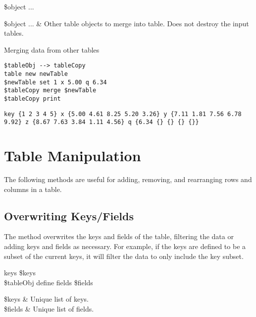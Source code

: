 \documentclass{article}
\begin{document}
\begin{syntax}
 \$object ...
\end{syntax}
\begin{args}
\$object ... & Other table objects to merge into table. Does not destroy the input tables. 
\end{args}

\begin{example}{Merging data from other tables}
\begin{lstlisting}
$tableObj --> tableCopy
table new newTable
$newTable set 1 x 5.00 q 6.34
$tableCopy merge $newTable
$tableCopy print
\end{lstlisting}
\tcblower
\begin{lstlisting}
key {1 2 3 4 5} x {5.00 4.61 8.25 5.20 3.26} y {7.11 1.81 7.56 6.78 9.92} z {8.67 7.63 3.84 1.11 4.56} q {6.34 {} {} {} {}}
\end{lstlisting}
\end{example}
\clearpage
\section{Table Manipulation}
The following methods are useful for adding, removing, and rearranging rows and columns in a table.

\subsection{Overwriting Keys/Fields}
The method  overwrites the keys and fields of the table, filtering the data or adding keys and fields as necessary. 
For example, if the keys are defined to be a subset of the current keys, it will filter the data to only include the key subset. 
\begin{syntax}
 keys \$keys \\
\$tableObj define fields \$fields
\end{syntax}
\begin{args}
\$keys & Unique list of keys. \\
\$fields & Unique list of fields.
\end{args}
\end{document}
